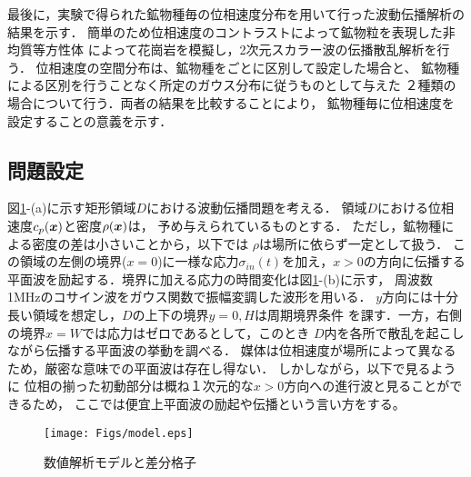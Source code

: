最後に，実験で得られた鉱物種毎の位相速度分布を用いて行った波動伝播解析の結果を示す．
簡単のため位相速度のコントラストによって鉱物粒を表現した非均質等方性体
によって花崗岩を模擬し，2次元スカラー波の伝播散乱解析を行う．
位相速度の空間分布は、鉱物種をごとに区別して設定した場合と、
鉱物種による区別を行うことなく所定のガウス分布に従うものとして与えた
２種類の場合について行う．両者の結果を比較することにより，
鉱物種毎に位相速度を設定することの意義を示す．
\subsection{問題設定}
図\ref{fig:fig15}-(a)に示す矩形領域$D$における波動伝播問題を考える．
領域$D$における位相速度$c_p(\mbox{\boldmath{$x$}})$と密度$\rho(\mbox{\boldmath{$x$}})$は，
予め与えられているものとする．
ただし，鉱物種による密度の差は小さいことから，以下では
$\rho$は場所に依らず一定として扱う．
この領域の左側の境界($x=0$)に一様な応力$\sigma_{in}(t)$を加え，$x>0$の方向に伝播する
平面波を励起する．境界に加える応力の時間変化は図\ref{fig:fig15}-(b)に示す，
周波数1MHzのコサイン波をガウス関数で振幅変調した波形を用いる．
$y$方向には十分長い領域を想定し，$D$の上下の境界$y=0,H$は周期境界条件
を課す．一方，右側の境界$x=W$では応力はゼロであるとして，このとき
$D$内を各所で散乱を起こしながら伝播する平面波の挙動を調べる．
媒体は位相速度が場所によって異なるため，厳密な意味での平面波は存在し得ない．
しかしながら，以下で見るように
位相の揃った初動部分は概ね１次元的な$x>0$方向への進行波と見ることができるため，
ここでは便宜上平面波の励起や伝播という言い方をする。
\begin{figure}
\begin{center}
	\texttt{[image: Figs/model.eps]}
	\caption{数値解析モデルと差分格子}
	\label{fig:fig15}
\end{center}
\end{figure}
